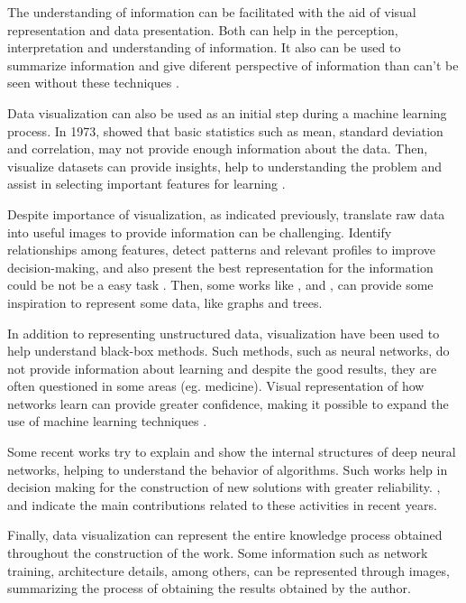 {\color{blue}


The understanding of information can be facilitated with the aid of visual representation and data presentation.
Both can help in the perception, interpretation and understanding of information.
It also can be used to summarize information and give diferent perspective of information than can't be seen without these techniques \cite{Kirk:2016}.

Data visualization can also be used as an initial step during a machine learning process.
In 1973, \cite{Anscombe:1973} showed that basic statistics such as mean, standard deviation and correlation, may not provide enough information about the data.
Then, visualize datasets can provide insights, help to understanding the problem and assist in selecting important features for learning \cite{Marsland:2014}.

Despite importance of visualization, as indicated previously, translate raw data into useful images to provide information can be challenging.
Identify relationships among features, detect patterns and relevant profiles to improve decision-making, and also present the best representation for the information could be not be a easy task \cite{Vellido:2011}.
Then, some works like \cite{Wilkinson:2016}, \cite{Chang:2016} and \cite{Michailidis:2016}, can provide some inspiration to represent some data, like graphs and trees.

In addition to representing unstructured data, visualization have been used to help understand black-box methods.
Such methods, such as neural networks, do not provide information about learning and despite the good results, they are often questioned in some areas (eg. medicine). 
Visual representation of how networks learn can provide greater confidence, making it possible to expand the use of machine learning techniques \cite{Chatzimparmpas:2020}.

Some recent works try to explain and show the internal structures of deep neural networks, helping to understand the behavior of algorithms.
Such works help in decision making for the construction of new solutions with greater reliability.
\cite{Chatzimparmpas:2020}, \cite{Hohman:2019} and \cite{Walny:2020} indicate the main contributions related to these activities in recent years.

Finally, data visualization can represent the entire knowledge process obtained throughout the construction of the work.
Some information such as network training, architecture details, among others, can be represented through images, summarizing the process of obtaining the results obtained by the author.
}


